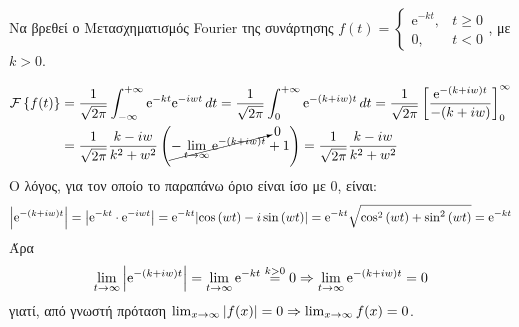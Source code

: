 \begin{example}
  Να βρεθεί ο Μετασχηματισμός Fourier της συνάρτησης 
  $ f(t) = 
  \begin{cases}
    \mathrm{e}^{-kt}, & t \geq 0 \\
    0, & {t} < 0
  \end{cases}$, με $ k>0 $.
\end{example}
\begin{solution}
  \begin{align*}
    \mathcal{F}\left\{f(t)\right\} 
    &= \frac{1}{\sqrt{2 \pi}} \int_{-\infty}^{+\infty}
    \mathrm{e}^{-kt} \mathrm{e}^{-iwt} \,{dt} = \frac{1}{\sqrt{2 \pi}}
    \int_{0}^{+\infty} \mathrm{e}^{-(k+iw)t} \,{dt} = \frac{1}{\sqrt{2 \pi}} 
    \left[\frac{\mathrm{e}^{-(k+iw)t}}{-(k+iw)}\right]_{0}^{\infty} \\
    &= \frac{1}{\sqrt{2 \pi}} \frac{k-iw}{k^{2}+w^{2}} \left(\cancelto{0}{-\lim_{t \to
    \infty} \mathrm{e}^{-(k+iw)t}} + 1\right) = \frac{1}{\sqrt{2 \pi}} 
    \frac{k-iw}{k^{2}+w^{2}} 
  \end{align*} 
  Ο λόγος, για τον οποίο το παραπάνω όριο είναι ίσο με 0, είναι:
  \[
    \abs{\mathrm{e}^{-(k+iw)t}} = \abs{\mathrm{e}^{-kt} \cdot \mathrm{e}^{-iwt}} =
    \mathrm{e}^{-kt} \abs{\cos{(wt)} - i \sin{(wt)}} = \mathrm{e}^{-kt}
    \sqrt{\cos^{2}{(wt)} + \sin^{2}{(wt)}} = \mathrm{e}^{-kt} 
  \] 
  Άρα 
  \[
    \lim_{t \to \infty} \abs{\mathrm{e}^{-(k+iw)t}} = 
    \lim_{t \to \infty} \mathrm{e}^{-kt} \overset{k>0}{=} 0 \Rightarrow 
    \lim_{t \to \infty} \mathrm{e}^{-(k+iw)t} = 0
  \] 
  γιατί, από γνωστή πρόταση 
  $ \lim_{x \to \infty} \abs{f(x)} = 0 \Rightarrow \lim_{x \to \infty} f(x) = 0 $.
\end{solution}

